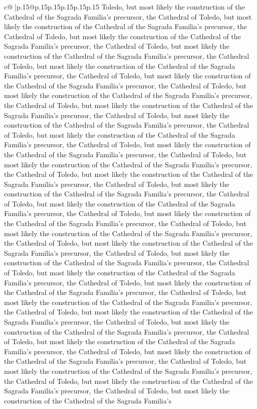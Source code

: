 \documentclass{article}
\begin{document}
{\begin{supertabular}{c@{$\;$}|p{.15\linewidth}@{}p{.15\linewidth}p{.15\linewidth}p{.15\linewidth}p{.15\linewidth}p{.15\linewidth}}
{{{Toledo, but most likely the construction of the Cathedral of the Sagrada Familia's precursor, the Cathedral of Toledo, but most likely the construction of the Cathedral of the Sagrada Familia's precursor, the Cathedral of Toledo, but most likely the construction of the Cathedral of the Sagrada Familia's precursor, the Cathedral of Toledo, but most likely the construction of the Cathedral of the Sagrada Familia's precursor, the Cathedral of Toledo, but most likely the construction of the Cathedral of the Sagrada Familia's precursor, the Cathedral of Toledo, but most likely the construction of the Cathedral of the Sagrada Familia's precursor, the Cathedral of Toledo, but most likely the construction of the Cathedral of the Sagrada Familia's precursor, the Cathedral of Toledo, but most likely the construction of the Cathedral of the Sagrada Familia's precursor, the Cathedral of Toledo, but most likely the construction of the Cathedral of the Sagrada Familia's precursor, the Cathedral of Toledo, but most likely the construction of the Cathedral of the Sagrada Familia's precursor, the Cathedral of Toledo, but most likely the construction of the Cathedral of the Sagrada Familia's precursor, the Cathedral of Toledo, but most likely the construction of the Cathedral of the Sagrada Familia's precursor, the Cathedral of Toledo, but most likely the construction of the Cathedral of the Sagrada Familia's precursor, the Cathedral of Toledo, but most likely the construction of the Cathedral of the Sagrada Familia's precursor, the Cathedral of Toledo, but most likely the construction of the Cathedral of the Sagrada Familia's precursor, the Cathedral of Toledo, but most likely the construction of the Cathedral of the Sagrada Familia's precursor, the Cathedral of Toledo, but most likely the construction of the Cathedral of the Sagrada Familia's precursor, the Cathedral of Toledo, but most likely the construction of the Cathedral of the Sagrada Familia's precursor, the Cathedral of Toledo, but most likely the construction of the Cathedral of the Sagrada Familia's precursor, the Cathedral of Toledo, but most likely the construction of the Cathedral of the Sagrada Familia's precursor, the Cathedral of Toledo, but most likely the construction of the Cathedral of the Sagrada Familia's precursor, the Cathedral of Toledo, but most likely the construction of the Cathedral of the Sagrada Familia's precursor, the Cathedral of Toledo, but most likely the construction of the Cathedral of the Sagrada Familia's precursor, the Cathedral of Toledo, but most likely the construction of the Cathedral of the Sagrada Familia's precursor, the Cathedral of Toledo, but most likely the construction of the Cathedral of the Sagrada Familia's precursor, the Cathedral of Toledo, but most likely the construction of the Cathedral of the Sagrada Familia's precursor, the Cathedral of Toledo, but most likely the construction of the Cathedral of the Sagrada Familia's precursor, the Cathedral of Toledo, but most likely the construction of the Cathedral of the Sagrada Familia's precursor, the Cathedral of Toledo, but most likely the construction of the Cathedral of the Sagrada Familia's }}}
\end{supertabular}}
\end{document}

